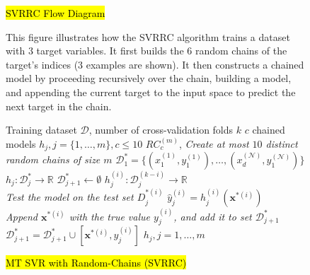\documentclass[preprint,12pt]{elsarticle}
\begin{document}
\begin{figure}[tpb]
\centering
\caption{\hl{SVRRC Flow Diagram}}
\small
\label{fig:svrrc}
\begin{minipage}{0.9\textwidth}

{\footnotesize This figure illustrates how the SVRRC algorithm trains a dataset with $3$ target variables. It first builds the $6$ random chains of the target's indices ($3$ examples are shown). It then constructs a chained model by proceeding recursively over the chain, building a model, and appending the current target to the input space to predict the next target in the chain. \par}
\end{minipage}
\begin{algorithm}[H]
\caption{\hl{MT SVR with Random-Chains (SVRRC)}}
\small
\label{alg:SVRRC} 
\begin{algorithmic}[1]
\renewcommand{\algorithmicrequire}{\textbf{Input:}}
\renewcommand{\algorithmicensure}{\textbf{Output:}}
\REQUIRE Training dataset $\mathcal{D}$, number of cross-validation folds $k$
\ENSURE  $c$ chained models $h_j, j = \{1,\ldots,m\}, c \leq 10$
\STATE $RC_c^{(m)}$, \textit{    Create at most $10$ distinct random chains of size $m$}
\STATE $\mathcal{D}_1^* = \{(x_1^{(1)},y_1^{(1)}),\ldots,(x_d^{(\mathcal N)},y_1^{(\mathcal N)})\}$
\STATE $h_j : \mathcal{D}_j^* \rightarrow \mathbb{R}$
\STATE $\mathcal{D}_{j+1}^* \leftarrow \emptyset$
\STATE $h_j^{(i)} : \mathcal{D}_j^{(k-i)} \rightarrow \mathbb{R}$
\\ \textit{Test the model on the test set $D_j^{*(i)}$}
\STATE $\hat{y}_j^{(i)} = h_j^{(i)}(\bm x^{*(i)})$
\\ \textit{Append $\bm x^{*(i)}$ with the true value $y_j^{(i)}$, and add it to set $\mathcal{D}_{j+1}^*$}
\STATE $\mathcal{D}_{j+1}^* = \mathcal{D}_{j+1}^* \cup [\bm x^{*(i)},y_j^{(i)}]$
\ENDFOR
\ENDFOR
\ENDIF
\ENDFOR
\RETURN $h_j, j=1,\ldots,m$ 
\end{algorithmic} 
\end{algorithm}
\end{figure}
\end{document}
